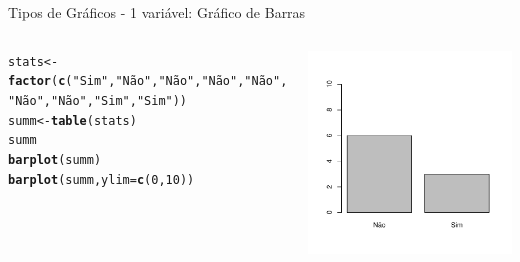 \documentclass{beamer}\usepackage[]{graphicx}\usepackage[]{color}
\makeatletter
\newcommand{\hlnum}[1]{\textcolor[rgb]{0.686,0.059,0.569}{#1}}%
\newcommand{\hlstr}[1]{\textcolor[rgb]{0.192,0.494,0.8}{#1}}%
\newcommand{\hlstd}[1]{\textcolor[rgb]{0.345,0.345,0.345}{#1}}%
\newcommand{\hlkwb}[1]{\textcolor[rgb]{0.69,0.353,0.396}{#1}}%
\newcommand{\hlkwc}[1]{\textcolor[rgb]{0.333,0.667,0.333}{#1}}%
\newcommand{\hlkwd}[1]{\textcolor[rgb]{0.737,0.353,0.396}{\textbf{#1}}}%
\newenvironment{kframe}{%
 \def\at@end@of@kframe{}%
 \ifinner\ifhmode%
  \def\at@end@of@kframe{\end{minipage}}%
  \begin{minipage}{\columnwidth}%
 \fi\fi%
 \def\FrameCommand##1{\hskip\@totalleftmargin \hskip-\fboxsep
 \colorbox{shadecolor}{##1}\hskip-\fboxsep
     \hskip-\linewidth \hskip-\@totalleftmargin \hskip\columnwidth}%
 \MakeFramed {\advance\hsize-\width
   \@totalleftmargin\z@ \linewidth\hsize
   \@setminipage}}%
 {\par\unskip\endMakeFramed%
 \at@end@of@kframe}
\newenvironment{knitrout}{}{} %
\renewenvironment{knitrout}{\setlength{\topsep}{0mm}}{}
\makeatother
\begin{document}
\begin{frame}[fragile]{Tipos de Gráficos - 1 variável: Gráfico de Barras}

\begin{columns}[t]

\begin{knitrout}\tiny
{}\color{fgcolor}\begin{kframe}
\begin{alltt}
\hlstd{stats} \hlkwb{<-} \hlkwd{factor}\hlstd{(}\hlkwd{c}\hlstd{(}\hlstr{"Sim"}\hlstd{,}\hlstr{"Não"}\hlstd{,}\hlstr{"Não"}\hlstd{,}\hlstr{"Não"}\hlstd{,}\hlstr{"Não"}\hlstd{,}
                  \hlstr{"Não"}\hlstd{,}\hlstr{"Não"}\hlstd{,}\hlstr{"Sim"}\hlstd{,}\hlstr{"Sim"}\hlstd{))}
\hlstd{summ} \hlkwb{<-} \hlkwd{table}\hlstd{(stats)}
\hlstd{summ}
\hlkwd{barplot}\hlstd{(summ)}
\hlkwd{barplot}\hlstd{(summ,}\hlkwc{ylim}\hlstd{=}\hlkwd{c}\hlstd{(}\hlnum{0}\hlstd{,}\hlnum{10}\hlstd{))}
\end{alltt}
\end{kframe}
\end{knitrout}


\begin{knitrout}
\color{fgcolor}
\includegraphics[width=1\linewidth]{figure/unnamed-chunk-49-1} 

\end{knitrout}

\end{columns}

\end{frame}
\end{document}
